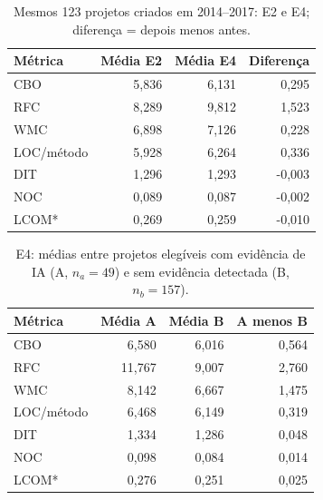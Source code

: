 \begin{table}[H]
\centering\small
\caption{Mesmos 123 projetos criados em 2014--2017: E2 e E4; diferença = depois menos antes.}
\begin{tabular}{lrrr}
\hline
Métrica & Média E2 & Média E4 & Diferença \\ \hline
CBO & 5,836 & 6,131 & 0,295 \\
RFC & 8,289 & 9,812 & 1,523 \\
WMC & 6,898 & 7,126 & 0,228 \\
LOC/método & 5,928 & 6,264 & 0,336 \\
DIT & 1,296 & 1,293 & -0,003 \\
NOC & 0,089 & 0,087 & -0,002 \\
LCOM* & 0,269 & 0,259 & -0,010 \\
\hline
\end{tabular}
\end{table}
\begin{table}[H]
\centering\small
\caption{E4: médias entre projetos elegíveis com evidência de IA (A, $n_a=49$) e sem evidência detectada (B, $n_b=157$).}
\begin{tabular}{lrrr}
\hline
Métrica & Média A & Média B & A menos B \\ \hline
CBO & 6,580 & 6,016 & 0,564 \\
RFC & 11,767 & 9,007 & 2,760 \\
WMC & 8,142 & 6,667 & 1,475 \\
LOC/método & 6,468 & 6,149 & 0,319 \\
DIT & 1,334 & 1,286 & 0,048 \\
NOC & 0,098 & 0,084 & 0,014 \\
LCOM* & 0,276 & 0,251 & 0,025 \\
\hline
\end{tabular}
\end{table}
